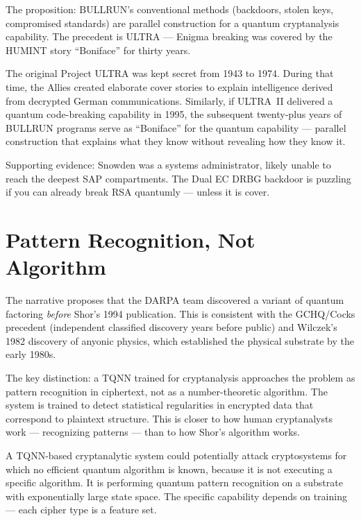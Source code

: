 
The proposition: BULLRUN's conventional methods (backdoors, stolen keys, compromised standards) are parallel construction for a quantum cryptanalysis capability. The precedent is ULTRA --- Enigma breaking was covered by the HUMINT story ``Boniface'' for thirty years.

The original Project ULTRA was kept secret from 1943 to 1974. During that time, the Allies created elaborate cover stories to explain intelligence derived from decrypted German communications. Similarly, if ULTRA~II delivered a quantum code-breaking capability in 1995, the subsequent twenty-plus years of BULLRUN programs serve as ``Boniface'' for the quantum capability --- parallel construction that explains what they know without revealing how they know it.

Supporting evidence: Snowden was a systems administrator, likely unable to reach the deepest SAP compartments. The Dual EC DRBG backdoor is puzzling if you can already break RSA quantumly --- unless it is cover.

\section*{Pattern Recognition, Not Algorithm}
\label{pos17:pattern-recognition-not-algorithm}


The narrative proposes that the DARPA team discovered a variant of quantum factoring \textit{before} Shor's 1994 publication. This is consistent with the GCHQ/Cocks precedent (independent classified discovery years before public) and Wilczek's 1982 discovery of anyonic physics, which established the physical substrate by the early 1980s.

The key distinction: a TQNN trained for cryptanalysis approaches the problem as pattern recognition in ciphertext, not as a number-theoretic algorithm. The system is trained to detect statistical regularities in encrypted data that correspond to plaintext structure. This is closer to how human cryptanalysts work --- recognizing patterns --- than to how Shor's algorithm works.

A TQNN-based cryptanalytic system could potentially attack cryptosystems for which no efficient quantum algorithm is known, because it is not executing a specific algorithm. It is performing quantum pattern recognition on a substrate with exponentially large state space. The specific capability depends on training --- each cipher type is a feature set.

